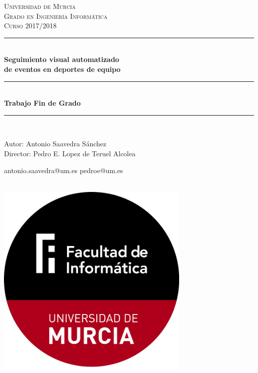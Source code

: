 \begin{titlepage}

\newcommand{\HRule}{\rule{\linewidth}{0.5mm}} %

\center %

\textsc{\LARGE Universidad de Murcia}\\[0.8cm]
\textsc{\Large Grado en Ingeniería Informática}\\[0.5cm]
\textsc{\large Curso 2017/2018}\\[0.4cm]

\HRule \\[0.6cm]
{ \huge \bfseries Seguimiento visual automatizado}\\[0.3cm]
 {\huge \bfseries de eventos en deportes de equipo}\\[0.3cm]
\HRule \\[0.5cm]
{ \Large \bfseries Trabajo Fin de Grado}\\[0.3cm]
\HRule \\[0.2cm]



\begin{minipage}{0.5\textwidth}
\begin{flushleft}
Autor: Antonio Saavedra Sánchez \\
Director: Pedro E. Lopez de Teruel Alcolea
\end{flushleft}
\end{minipage}
\begin{minipage}{0.3\textwidth}
\begin{flushright}
antonio.saavedra@um.es
pedroe@um.es
\end{flushright}
\end{minipage}\\[1cm]

\centering
\includegraphics[width=0.7\textwidth]{./images/logo}


\end{titlepage}

